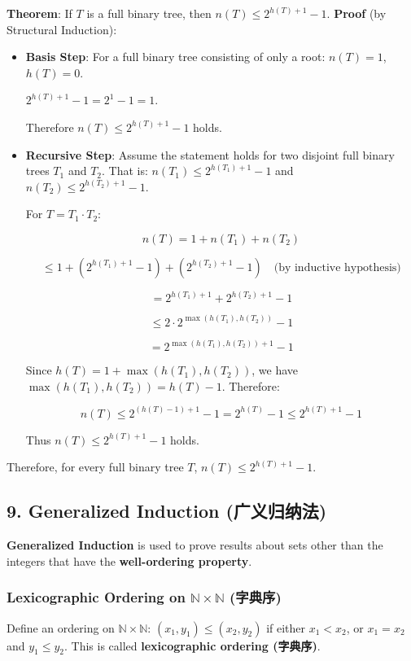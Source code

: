 \documentclass[10pt,a4paper,openany]{ctexbook}
\theoremstyle{definition}
\theoremstyle{remark}
\begin{document}
\textbf{Theorem}: If $T$ is a full binary tree, then $n(T) \le 2^{h(T)+1} - 1$.
\textbf{Proof} (by Structural Induction):
\begin{itemize}
\item \textbf{Basis Step}: For a full binary tree consisting of only a root:
$n(T) = 1$, $h(T) = 0$.

$2^{h(T)+1} - 1 = 2^{1} - 1 = 1$.

Therefore $n(T) \le 2^{h(T)+1} - 1$ holds.


\item \textbf{Recursive Step}: Assume the statement holds for two disjoint full binary trees $T_1$ and $T_2$.
That is: $n(T_1) \le 2^{h(T_1)+1} - 1$ and $n(T_2) \le 2^{h(T_2)+1} - 1$.


For $T = T_1 \cdot T_2$:

\[
n(T) = 1 + n(T_1) + n(T_2)
\]

\[
\le 1 + (2^{h(T_1)+1} - 1) + (2^{h(T_2)+1} - 1) \quad \text{(by inductive hypothesis)}
\]

\[
= 2^{h(T_1)+1} + 2^{h(T_2)+1} - 1
\]

\[
\le 2 \cdot 2^{\max(h(T_1), h(T_2))} - 1
\]

\[
= 2^{\max(h(T_1), h(T_2)) + 1} - 1
\]


Since $h(T) = 1 + \max(h(T_1), h(T_2))$, we have $\max(h(T_1), h(T_2)) = h(T) - 1$. Therefore:

\[
n(T) \le 2^{(h(T)-1) + 1} - 1 = 2^{h(T)} - 1 \le 2^{h(T)+1} - 1
\]


Thus $n(T) \le 2^{h(T)+1} - 1$ holds.


\end{itemize}

Therefore, for every full binary tree $T$, $n(T) \le 2^{h(T)+1} - 1$.
\vspace{-2pt}

\subsection{9. Generalized Induction (广义归纳法)}

\textbf{Generalized Induction} is used to prove results about sets other than the integers that have the \textbf{well-ordering property}.
\subsubsection{Lexicographic Ordering on $\mathbb{N} \times \mathbb{N}$ (字典序)}

Define an ordering on $\mathbb{N} \times \mathbb{N}$: $(x_1, y_1) \le (x_2, y_2)$ if either $x_1 < x_2$, or $x_1 = x_2$ and $y_1 \le y_2$.
This is called \textbf{lexicographic ordering (字典序)}.
\end{document}
